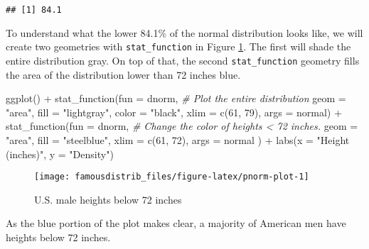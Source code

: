 \documentclass[
]{article}
\newenvironment{Shaded}{\begin{snugshade}}{\end{snugshade}}
\newcommand{\AttributeTok}[1]{\textcolor[rgb]{0.77,0.63,0.00}{#1}}
\newcommand{\CommentTok}[1]{\textcolor[rgb]{0.56,0.35,0.01}{\textit{#1}}}
\newcommand{\DecValTok}[1]{\textcolor[rgb]{0.00,0.00,0.81}{#1}}
\newcommand{\FunctionTok}[1]{\textcolor[rgb]{0.00,0.00,0.00}{#1}}
\newcommand{\NormalTok}[1]{#1}
\newcommand{\SpecialCharTok}[1]{\textcolor[rgb]{0.00,0.00,0.00}{#1}}
\newcommand{\StringTok}[1]{\textcolor[rgb]{0.31,0.60,0.02}{#1}}
\begin{document}
\begin{verbatim}
## [1] 84.1
\end{verbatim}

To understand what the lower 84.1\% of the normal distribution looks like, we will create two geometries with \texttt{stat\_function} in Figure \ref{fig:pnorm-plot}. The first will shade the entire distribution gray. On top of that, the second \texttt{stat\_function} geometry fills the area of the distribution lower than 72 inches blue.

\begin{Shaded}
\begin{Highlighting}[]
\FunctionTok{ggplot}\NormalTok{() }\SpecialCharTok{+}
  \FunctionTok{stat\_function}\NormalTok{(}\AttributeTok{fun =}\NormalTok{ dnorm, }\CommentTok{\# Plot the entire distribution}
                \AttributeTok{geom =} \StringTok{"area"}\NormalTok{,}
                \AttributeTok{fill =} \StringTok{"lightgray"}\NormalTok{,}
                \AttributeTok{color =} \StringTok{"black"}\NormalTok{,}
                \AttributeTok{xlim =} \FunctionTok{c}\NormalTok{(}\DecValTok{61}\NormalTok{, }\DecValTok{79}\NormalTok{),}
                \AttributeTok{args =}\NormalTok{ normal) }\SpecialCharTok{+}
  \FunctionTok{stat\_function}\NormalTok{(}\AttributeTok{fun =}\NormalTok{ dnorm, }\CommentTok{\# Change the color of heights \textless{} 72 inches.}
                \AttributeTok{geom =} \StringTok{"area"}\NormalTok{,}
                \AttributeTok{fill =} \StringTok{"steelblue"}\NormalTok{,}
                \AttributeTok{xlim =} \FunctionTok{c}\NormalTok{(}\DecValTok{61}\NormalTok{, }\DecValTok{72}\NormalTok{),}
                \AttributeTok{args =}\NormalTok{ normal}
\NormalTok{                ) }\SpecialCharTok{+}
  \FunctionTok{labs}\NormalTok{(}\AttributeTok{x =} \StringTok{"Height (inches)"}\NormalTok{, }\AttributeTok{y =} \StringTok{"Density"}\NormalTok{)}
\end{Highlighting}
\end{Shaded}

\begin{figure}

{\centering \texttt{[image: famousdistrib\_files/figure-latex/pnorm-plot-1]} 

}

\caption{U.S. male heights below 72 inches}\label{fig:pnorm-plot}
\end{figure}

As the blue portion of the plot makes clear, a majority of American men have heights below 72 inches.
\end{document}
